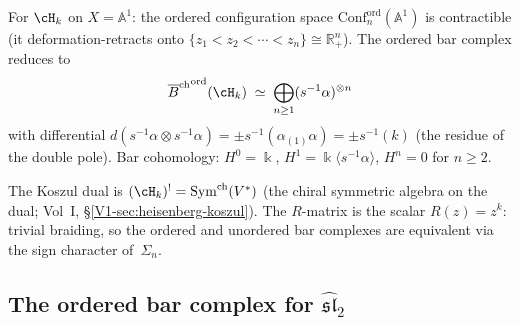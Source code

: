 \begin{computation}
For $\cH_k$ on $X=\mathbb A^1$: the ordered configuration
space $\mathrm{Conf}_n^{\mathrm{ord}}(\mathbb A^1)$ is
contractible (it deformation-retracts onto
$\{z_1<z_2<\cdots<z_n\}\cong\mathbb R^n_+$).
The ordered bar complex reduces to
\[
{\Barch}^{\mathrm{ord}}(\cH_k)
\;\simeq\;
\bigoplus_{n\ge 1}(s^{-1}\alpha)^{\otimes n}
\]
with differential $d(s^{-1}\alpha\otimes s^{-1}\alpha)
=\pm s^{-1}(\alpha_{(1)}\alpha)=\pm s^{-1}(k)$
(the residue of the double pole). Bar cohomology:
$H^0=\Bbbk$, $H^1=\Bbbk\langle s^{-1}\alpha\rangle$,
$H^n=0$ for $n\ge 2$.

The Koszul dual is $(\cH_k)^!=\mathrm{Sym}^{\mathrm{ch}}(V^*)$
(the chiral symmetric algebra on the dual; Vol~I, \S\ref*{V1-sec:heisenberg-koszul}). The $R$-matrix is
the scalar $R(z)=z^k$: trivial braiding, so the ordered
and unordered bar complexes are equivalent via the sign
character of~$\Sigma_n$.
\end{computation}

\subsection{The ordered bar complex for $\widehat{\mathfrak{sl}}_2$}

